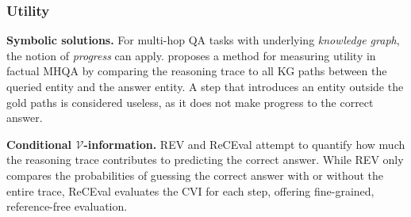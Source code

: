 
\subsubsection{Utility}

\textbf{Symbolic solutions.} \hspace{0.1cm} For multi-hop QA tasks with underlying \textit{knowledge graph}, the notion of \textit{progress} can apply. \citet{nguyen-etal-2024-direct} proposes a method for measuring utility in factual MHQA by comparing the reasoning trace to all KG paths between the queried entity and the answer entity. A step that introduces an entity outside the gold paths is considered useless, as it does not make progress to the correct answer.

\textbf{Conditional $\mathcal{V}$-information.} REV \citep{chen-etal-2023-rev} and ReCEval \citep{prasad-etal-2023-receval} attempt to quantify how much the reasoning trace contributes to predicting the correct answer. While REV only compares the probabilities of guessing the correct answer with or without the entire trace, ReCEval evaluates the CVI for each step, offering fine-grained, reference-free evaluation.


